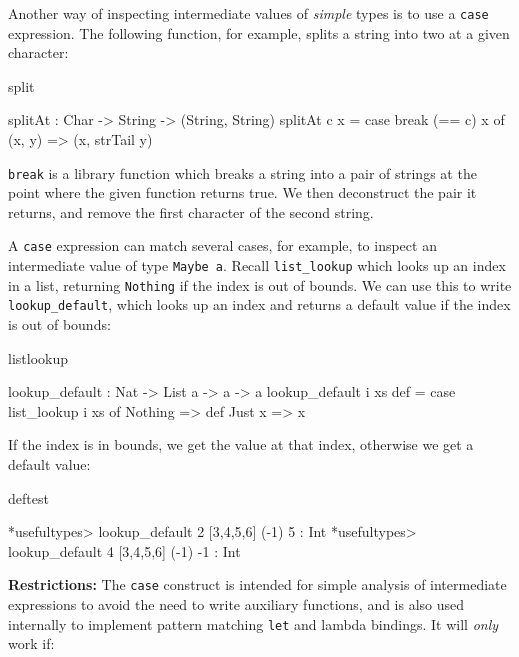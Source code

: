 Another way of inspecting intermediate values of \emph{simple} types
is to use a \texttt{case} expression.
The following function, for example, splits a string into two at a given character:

\begin{SaveVerbatim}{split}

splitAt : Char -> String -> (String, String)
splitAt c x = case break (== c) x of
                  (x, y) => (x, strTail y)

\end{SaveVerbatim}

\noindent
\texttt{break} is a library function which breaks a string into a pair of strings
at the point where the given function returns true. We then deconstruct the
pair it returns, and remove the first character of the second string.

A \texttt{case} expression can match several cases, for example, to inspect an
intermediate value of type \texttt{Maybe a}. Recall \texttt{list\_lookup} which
looks up an index in a list, returning \texttt{Nothing} if the index is out
of bounds. We can use this to write \texttt{lookup\_default}, which
looks up an index and returns a default value if the index is out of bounds:

\begin{SaveVerbatim}{listlookup}

lookup_default : Nat -> List a -> a -> a
lookup_default i xs def = case list_lookup i xs of
                              Nothing => def
                              Just x => x

\end{SaveVerbatim}

\noindent
If the index is in bounds, we get the value at that index, otherwise we get
a default value:

\begin{SaveVerbatim}{deftest}

*usefultypes> lookup_default 2 [3,4,5,6] (-1)
5 : Int
*usefultypes> lookup_default 4 [3,4,5,6] (-1)
-1 : Int

\end{SaveVerbatim}

\noindent
\textbf{Restrictions:} The \texttt{case} construct is intended for simple analysis
of intermediate expressions to avoid the need to write auxiliary functions, and is
also used internally to implement pattern matching \texttt{let} and lambda bindings. 
It will \emph{only} work if:

